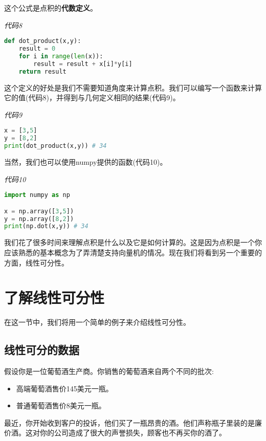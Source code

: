 这个公式是点积的\textbf{代数定义}。

\emph{代码8}

\begin{lstlisting}[language=python]
def dot_product(x,y): 
    result = 0 
    for i in range(len(x)): 
        result = result + x[i]*y[i] 
    return result

\end{lstlisting}
这个定义的好处是我们不需要知道角度来计算点积。我们可以编写一个函数来计算它的值(代码8)，并得到与几何定义相同的结果(代码9)。


\emph{代码9}

\begin{lstlisting}[language=python]
x = [3,5]
y = [8,2] 
print(dot_product(x,y)) # 34

\end{lstlisting}
当然，我们也可以使用numpy提供的函数(代码10)。

\emph{代码10}

\begin{lstlisting}[language=python]
import numpy as np 

x = np.array([3,5]) 
y = np.array([8,2]) 
print(np.dot(x,y)) # 34

\end{lstlisting}
我们花了很多时间来理解点积是什么以及它是如何计算的。这是因为点积是一个你应该熟悉的基本概念为了弄清楚支持向量机的情况。现在我们将看到另一个重要的方面，线性可分性。

\section{了解线性可分性}

在这一节中，我们将用一个简单的例子来介绍线性可分性。

\subsection{线性可分的数据}
假设你是一位葡萄酒生产商。你销售的葡萄酒来自两个不同的批次:

\begin{itemize}
    \item 高端葡萄酒售价145美元一瓶。
    \item 普通葡萄酒售价8美元一瓶。
\end{itemize}

最近，你开始收到客户的投诉，他们买了一瓶昂贵的酒。他们声称瓶子里装的是廉价酒。这对你的公司造成了很大的声誉损失，顾客也不再买你的酒了。

